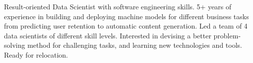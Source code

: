 

\begin{cvparagraph}

Result-oriented Data Scientist with software engineering skills. 5+ years of experience in building and deploying machine models for different business tasks from predicting user retention to automatic content generation. Led a team of 4 data scientists of different skill levels. Interested in devising a better problem-solving method for challenging tasks, and learning new technologies and tools. Ready for relocation.
\end{cvparagraph}
